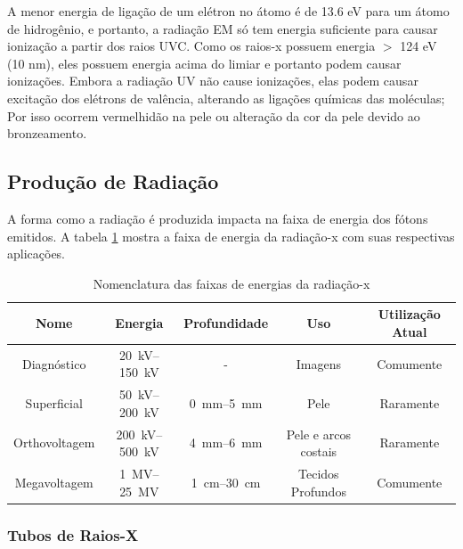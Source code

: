 \documentclass[11pt,a4paper]{article}
\begin{document}
    A menor energia de ligação de um elétron no átomo é de 13.6 eV para um átomo de hidrogênio, e portanto, a radiação EM só tem energia suficiente para causar ionização a partir dos raios UVC. Como os raios-x possuem energia $>$ 124 eV (10 nm), eles possuem energia acima do limiar e portanto podem causar ionizações. Embora a radiação UV não cause ionizações, elas podem causar excitação dos elétrons de valência, alterando as ligações químicas das moléculas; Por isso ocorrem vermelhidão na pele ou alteração da cor da pele devido ao bronzeamento.

\subsection*{Produção de Radiação}
                
    A forma como a radiação é produzida impacta na faixa de energia dos fótons emitidos. A tabela \ref{tab:nomesRadiacaoX} mostra a faixa de energia da radiação-x com suas respectivas aplicações.

                \begin{table}
                    \centering
                    \caption{Nomenclatura das faixas de energias da radiação-x}
                    \label{tab:nomesRadiacaoX}
                    \begin{tabular}{c c c c c}
                        \hline
                        Nome & Energia & Profundidade & Uso & Utilização Atual \\
                        \hline
                        Diagnóstico & \qtyrange{20}{150}{kV} & - & Imagens & Comumente \\
                        Superficial & \qtyrange{50}{200}{kV} & \qtyrange{0}{5}{mm}  & Pele & Raramente \\
                        Orthovoltagem & \qtyrange{200}{500}{kV} & \qtyrange{4}{6}{mm}  & Pele e arcos costais & Raramente \\
                        Megavoltagem & \qtyrange{1}{25}{MV} & \qtyrange{1}{30}{cm}  & Tecidos Profundos & Comumente \\
                        \hline
                        \hline
                    \end{tabular}
                \end{table}
        
\subsubsection*{Tubos de Raios-X}
\end{document}
